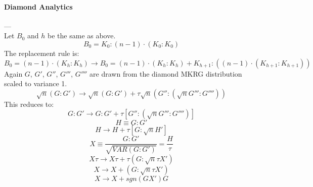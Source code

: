\documentclass[twocolumn,aps,showpacs,superscriptaddress,prl]{revtex4}
\begin{document}
\paragraph*{Diamond Analytics} ---\\
Let $B_0$ and $h$ be the same as above. 
\begin{equation}
B_0 = K_0 :(n-1)\cdot (K_0:K_0)
\end{equation}
The replacement rule is:
\begin{equation}
B_0 = (n-1)\cdot(K_h:K_h) \rightarrow
B_0 = (n-1)\cdot(K_h:K_h) + K_{h+1} : ((n-1)\cdot(K_{h+1}:K_{h+1}))
\end{equation}
Again $G$, $G'$, $G''$, $G'''$, $G''''$ are drawn from the diamond MKRG distribution scaled to variance 1.
\begin{equation}
\sqrt{n}(G:G') \rightarrow \sqrt{n}(G:G')+ \tau \sqrt{n}(G'':(\sqrt{n} G''':G''''))
\end{equation}
This reduces to:
\begin{equation}
G:G' \rightarrow G:G' + \tau [G'': (\sqrt{n}G''':G'''')]
\end{equation}
\begin{equation}
H \equiv G:G'
\end{equation}
\begin{equation}
H \rightarrow H+ \tau[G:\sqrt{n} H']
\end{equation}
\begin{equation}
X \equiv \frac{G:G'}{\sqrt{VAR(G:G')}} = \frac{H}{\tau}
\end{equation}
\begin{equation}
X \tau \rightarrow X\tau + \tau(G:\sqrt{n} \tau X')
\end{equation}
\begin{equation}
X \rightarrow X + (G:\sqrt{n}\tau X')
\end{equation}
\begin{equation}
X \rightarrow X + sgn(GX')G
\end{equation}

\begin{acknowledgments}



\end{acknowledgments}



\end{document}
